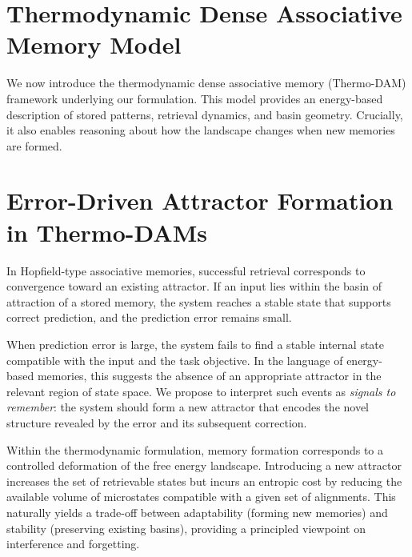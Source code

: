 \documentclass[11pt,a4paper]{article}
\begin{document}
\section{Thermodynamic Dense Associative Memory Model}
\label{sec:thermo_dam}

We now introduce the thermodynamic dense associative memory (Thermo-DAM) framework underlying our formulation.
This model provides an energy-based description of stored patterns, retrieval dynamics, and basin geometry.
Crucially, it also enables reasoning about how the landscape changes when new memories are formed.


\section{Error-Driven Attractor Formation in Thermo-DAMs}
\label{sec:formation}

In Hopfield-type associative memories, successful retrieval corresponds to convergence toward an existing attractor.
If an input lies within the basin of attraction of a stored memory, the system reaches a stable state that supports correct prediction, and the prediction error remains small.

When prediction error is large, the system fails to find a stable internal state compatible with the input and the task objective.
In the language of energy-based memories, this suggests the absence of an appropriate attractor in the relevant region of state space.
We propose to interpret such events as \emph{signals to remember}: the system should form a new attractor that encodes the novel structure revealed by the error and its subsequent correction.

Within the thermodynamic formulation, memory formation corresponds to a controlled deformation of the free energy landscape.
Introducing a new attractor increases the set of retrievable states but incurs an entropic cost by reducing the available volume of microstates compatible with a given set of alignments.
This naturally yields a trade-off between adaptability (forming new memories) and stability (preserving existing basins), providing a principled viewpoint on interference and forgetting.
\end{document}
